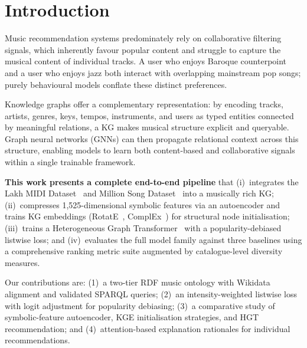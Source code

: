 \section{Introduction}
\label{sec:intro}

Music recommendation systems predominately rely on collaborative filtering signals, which inherently favour popular content and struggle to capture the musical content of individual tracks. A user who enjoys Baroque counterpoint and a user who enjoys jazz both interact with overlapping mainstream pop songs; purely behavioural models conflate these distinct preferences.

Knowledge graphs offer a complementary representation: by encoding tracks, artists, genres, keys, tempos, instruments, and users as typed entities connected by meaningful relations, a KG makes musical structure explicit and queryable. Graph neural networks (GNNs) can then propagate relational context across this structure, enabling models to learn both content-based and collaborative signals within a single trainable framework.

\textbf{This work presents a complete end-to-end pipeline} that (i)~integrates the Lakh MIDI Dataset~\cite{raffel2016lakh} and Million Song Dataset~\cite{msd2011} into a musically rich KG; (ii)~compresses 1,525-dimensional symbolic features via an autoencoder and trains KG embeddings (RotatE~\cite{sun2019rotate}, ComplEx~\cite{trouillon2016complex}) for structural node initialisation; (iii)~trains a Heterogeneous Graph Transformer~\cite{hu2020hgt} with a popularity-debiased listwise loss; and (iv)~evaluates the full model family against three baselines using a comprehensive ranking metric suite augmented by catalogue-level diversity measures.

Our contributions are: (1)~a two-tier RDF music ontology with Wikidata alignment and validated SPARQL queries; (2)~an intensity-weighted listwise loss with logit adjustment for popularity debiasing; (3)~a comparative study of symbolic-feature autoencoder, KGE initialisation strategies, and HGT recommendation; and (4)~attention-based explanation rationales for individual recommendations.
